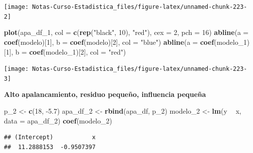 \documentclass[
  12pt,
]{book}
\newenvironment{Shaded}{\begin{snugshade}}{\end{snugshade}}
\newcommand{\DataTypeTok}[1]{\textcolor[rgb]{0.13,0.29,0.53}{#1}}
\newcommand{\DecValTok}[1]{\textcolor[rgb]{0.00,0.00,0.81}{#1}}
\newcommand{\FloatTok}[1]{\textcolor[rgb]{0.00,0.00,0.81}{#1}}
\newcommand{\KeywordTok}[1]{\textcolor[rgb]{0.13,0.29,0.53}{\textbf{#1}}}
\newcommand{\NormalTok}[1]{#1}
\newcommand{\OperatorTok}[1]{\textcolor[rgb]{0.81,0.36,0.00}{\textbf{#1}}}
\newcommand{\StringTok}[1]{\textcolor[rgb]{0.31,0.60,0.02}{#1}}
\theoremstyle{definition}
\theoremstyle{definition}
\theoremstyle{definition}
\theoremstyle{remark}
\begin{document}
\begin{center}\texttt{[image: Notas-Curso-Estadistica\_files/figure-latex/unnamed-chunk-223-2]} \end{center}

\begin{Shaded}
\begin{Highlighting}[]
\KeywordTok{plot}\NormalTok{(apa_df_}\DecValTok{1}\NormalTok{, }\DataTypeTok{col =} \KeywordTok{c}\NormalTok{(}\KeywordTok{rep}\NormalTok{(}\StringTok{"black"}\NormalTok{, }\DecValTok{10}\NormalTok{), }\StringTok{"red"}\NormalTok{), }\DataTypeTok{cex =} \DecValTok{2}\NormalTok{, }
    \DataTypeTok{pch =} \DecValTok{16}\NormalTok{)}
\KeywordTok{abline}\NormalTok{(}\DataTypeTok{a =} \KeywordTok{coef}\NormalTok{(modelo)[}\DecValTok{1}\NormalTok{], }\DataTypeTok{b =} \KeywordTok{coef}\NormalTok{(modelo)[}\DecValTok{2}\NormalTok{], }\DataTypeTok{col =} \StringTok{"blue"}\NormalTok{)}
\KeywordTok{abline}\NormalTok{(}\DataTypeTok{a =} \KeywordTok{coef}\NormalTok{(modelo_}\DecValTok{1}\NormalTok{)[}\DecValTok{1}\NormalTok{], }\DataTypeTok{b =} \KeywordTok{coef}\NormalTok{(modelo_}\DecValTok{1}\NormalTok{)[}\DecValTok{2}\NormalTok{], }
    \DataTypeTok{col =} \StringTok{"red"}\NormalTok{)}
\end{Highlighting}
\end{Shaded}

\begin{center}\texttt{[image: Notas-Curso-Estadistica\_files/figure-latex/unnamed-chunk-223-3]} \end{center}

\textbf{Alto apalancamiento, residuo pequeño, influencia pequeña}

\begin{Shaded}
\begin{Highlighting}[]
\NormalTok{p_}\DecValTok{2}\NormalTok{ <-}\StringTok{ }\KeywordTok{c}\NormalTok{(}\DecValTok{18}\NormalTok{, }\FloatTok{-5.7}\NormalTok{)}
\NormalTok{apa_df_}\DecValTok{2}\NormalTok{ <-}\StringTok{ }\KeywordTok{rbind}\NormalTok{(apa_df, p_}\DecValTok{2}\NormalTok{)}
\NormalTok{modelo_}\DecValTok{2}\NormalTok{ <-}\StringTok{ }\KeywordTok{lm}\NormalTok{(y }\OperatorTok{~}\StringTok{ }\NormalTok{x, }\DataTypeTok{data =}\NormalTok{ apa_df_}\DecValTok{2}\NormalTok{)}
\KeywordTok{coef}\NormalTok{(modelo_}\DecValTok{2}\NormalTok{)}
\end{Highlighting}
\end{Shaded}

\begin{verbatim}
## (Intercept)           x 
##  11.2888153  -0.9507397
\end{verbatim}
\end{document}
